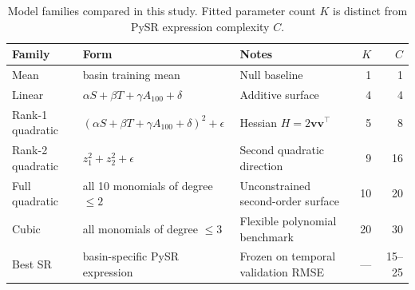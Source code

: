 \begin{table}[htbp]
\centering
\caption{Model families compared in this study. Fitted parameter count $K$ is distinct from PySR expression complexity $C$.}
\label{tab:model_families}
\small
\begin{tabular}{llp{6.6cm}rr}
\toprule
Family & Form & Notes & $K$ & $C$ \\
\midrule
Mean & basin training mean & Null baseline & 1 & 1 \\
Linear & $\alpha S+\beta T+\gamma A_{100}+\delta$ & Additive surface & 4 & 4 \\
Rank-1 quadratic & $(\alpha S+\beta T+\gamma A_{100}+\delta)^2+\epsilon$ & Hessian $H=2\mathbf{v}\mathbf{v}^\top$ & 5 & 8 \\
Rank-2 quadratic & $z_1^2+z_2^2+\epsilon$ & Second quadratic direction & 9 & 16 \\
Full quadratic & all 10 monomials of degree $\le 2$ & Unconstrained second-order surface & 10 & 20 \\
Cubic & all monomials of degree $\le 3$ & Flexible polynomial benchmark & 20 & 30 \\
Best SR & basin-specific PySR expression & Frozen on temporal validation RMSE & --- & 15--25 \\
\bottomrule
\end{tabular}
\end{table}
